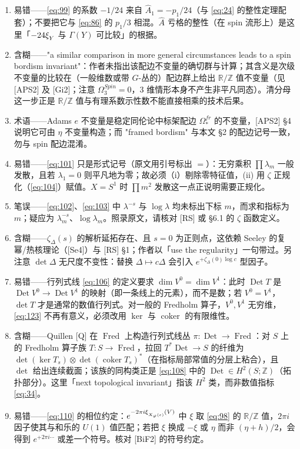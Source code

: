 \documentclass[11pt]{amsart}
\theoremstyle{definition}
\theoremstyle{remark}
\theoremstyle{plain}
\numberwithin{equation}{section}
\renewcommand{\:}{\colon}
\newcommand{\RR}{{\mathbb R}}
\newcommand{\ZZ}{{\mathbb Z}}
\newcommand{\cir}{S^1}
\DeclareMathOperator{\coker}{coker}
\DeclareRobustCommand{\mstrut}{^{\vphantom{1*\prime y\vee M}}}
\DeclareMathOperator{\Det}{Det}
\DeclareMathOperator{\Fred}{Fred}
\newcommand{\RZ}{\RR/\ZZ}
\newcommand{\xia}[1]{\xi \mstrut _{#1}}
\begin{document}
\begin{enumerate}[leftmargin=2.2em,itemsep=2pt,topsep=2pt]
  \item 易错——\eqref{eq:99} 的系数 $-1/24$ 来自 $\hat A_1=-p_1/24$（与 \eqref{eq:24} 的整性定理配套）；不要把它与 \eqref{eq:86} 的 $p_1/3$ 相混。$\hat A$ 亏格的整性（在 spin 流形上）是这里「$-24\xia Y$ 与 $\Gamma(Y)$ 可比较」的根据。
  \item 含糊——"a similar comparison in more general circumstances leads to a spin bordism invariant"：作者未指出该配边不变量的确切群与计算；其含义是次级不变量的比较在（一般维数或带 $G$-丛的）配边群上给出 $\RZ$ 值不变量（见 [APS2] 及 [Gi2]；注意 $\Omega^{Spin}_3=0$，3 维情形本身不产生非平凡同态）。清分母这一步正是 $\RZ$ 值与有理系数示性数不能直接相乘的技术后果。
  \item 术语——Adams $e$ 不变量是稳定同伦论中标架配边 $\Omega^{fr}_*$ 的不变量，[APS2] §4 说明它可由 $\eta$ 不变量构造；而 "framed bordism" 与本文 §2 的配边记号一致，勿与 spin 配边混淆。
  \item 易错——\eqref{eq:101} 只是形式记号（原文用引号标出 $=$）：无穷乘积 $\prod\lambda_m$ 一般发散，且若 $\lambda_1=0$ 则平凡地为零；故必须（i）剔除零特征值，(ii) 用 $\zeta$ 正规化（\eqref{eq:104}）赋值。$X=\cir$ 时 $\prod m^2$ 发散这一点正说明需要正规化。
  \item 笔误——\eqref{eq:102}、\eqref{eq:103} 中 $\lambda^{-s}$ 与 $\log\lambda$ 均未标出下标 $m$，而求和指标为 $m$；疑应为 $\lambda_m^{-s}$、$\log\lambda_m$。照录原文，请核对 [RS] 或 §6.1 的 $\zeta$ 函数定义。
  \item 含糊——$\zeta_\Delta(s)$ 的解析延拓存在、且 $s=0$ 为正则点，这依赖 Seeley 的复幂/热核理论（[Se4]）与 [RS] §1；作者以「use the regularity」一句带过。另注意 $\det\Delta$ 无尺度不变性：替换 $\Delta\mapsto c\Delta$ 会引入 $e^{+\zeta_\Delta(0)\log c}$ 型因子。
  \item 易错——行列式线 \eqref{eq:106} 的定义要求 $\dim V^0=\dim V^1$：此时 $\Det T$ 是 $\Det V^0\to\Det V^1$ 的映射（即一条线上的元素），而不是数；若 $V^0=V^1$，$\det T$ 才是通常的数值行列式。对一般的 Fredholm 算子，$V^0,V^1$ 无穷维，\eqref{eq:123} 不再有意义，必须改用 $\ker$ 与 $\coker$ 的有限维性。
  \item 含糊——Quillen [Q] 在 $\Fred$ 上构造行列式线丛 $\pi:\Det\to\Fred$：对 $S$ 上的 Fredholm 算子族 $T:S\to\Fred$，拉回 $T^*\Det\to S$ 的纤维为 $\det(\ker T_s)\otimes\det(\coker T_s)^*$（在指标局部常值的分层上粘合），且 $\det$ 给出连续截面；该族的同构类正是 \eqref{eq:108} 中的 $\Det\in H^2(S;\ZZ)$（拓扑部分）。这里「next topological invariant」指该 $H^2$ 类，而非数值指标 \eqref{eq:34}。
  \item 易错——\eqref{eq:110} 的相位约定：$e^{-2\pi i\xia{X_\varphi(\epsilon)}(V)}$ 中 $\xi$ 取 \eqref{eq:98} 的 $\RZ$ 值，$2\pi i$ 因子使其与和乐的 $U(1)$ 值匹配；若把 $\xi$ 换成 $-\xi$ 或 $\eta$ 而非 $(\eta+h)/2$，会得到 $e^{+2\pi i\cdots}$ 或差一个符号。核对 [BiF2] 的符号约定。

\end{enumerate}
\end{document}
